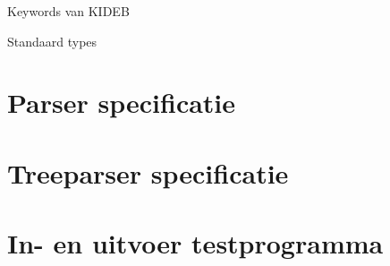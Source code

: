 \clearpage

Keywords van KIDEB
\begin{description}
    \item {}      
    \item {}    
    \item {}       
    \item {}         
    \item {}       
    \item {}       
    \item {}         
    \item {}      
    \item {}       
    \item {}     
    \item {}      
    \item {}   
    \item {}     
    \item {}        
    \item {}         
    \item {}    
    \item {}       
    \item {}      
    \item {}       
    \item {}        
    \item {}         
\end{description}

\clearpage

Standaard types
\begin{description}
    \item {}      
    \item {}    
    \item {}  
    \item {}    
    \item {}       
\end{description}

\clearpage
\section{Parser specificatie}  
    \label{sec:parser_specificatie}

\section{Treeparser specificatie}  
    \label{sec:treeparser_specificatie}

\clearpage
\section{In- en uitvoer testprogramma}
    \label{sec:testen_io}

\clearpage